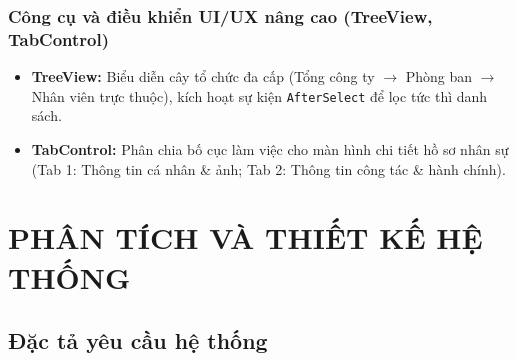 \documentclass[12pt,a4paper]{report}
\begin{document}
\subsection{Công cụ và điều khiển UI/UX nâng cao (TreeView, TabControl)}
\begin{itemize}[leftmargin=1.0cm]
    \item \textbf{TreeView:} Biểu diễn cây tổ chức đa cấp (Tổng công ty $\rightarrow$ Phòng ban $\rightarrow$ Nhân viên trực thuộc), kích hoạt sự kiện \texttt{AfterSelect} để lọc tức thì danh sách.
    \item \textbf{TabControl:} Phân chia bố cục làm việc cho màn hình chi tiết hồ sơ nhân sự (Tab 1: Thông tin cá nhân \& ảnh; Tab 2: Thông tin công tác \& hành chính).
\end{itemize}

\chapter{PHÂN TÍCH VÀ THIẾT KẾ HỆ THỐNG}

\section{Đặc tả yêu cầu hệ thống}
\end{document}
